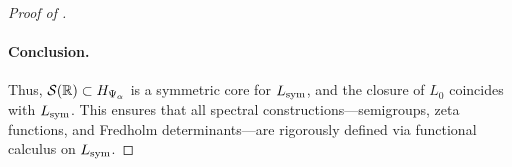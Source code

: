 \begin{proof}[Proof of ]
\paragraph{Conclusion.}
Thus, \( \mathcal{S}(\mathbb{R}) \subset H_{\Psi_\alpha} \) is a symmetric core for \( L_{\mathrm{sym}} \), and the closure of \( L_0 \) coincides with \( L_{\mathrm{sym}} \). This ensures that all spectral constructions—semigroups, zeta functions, and Fredholm determinants—are rigorously defined via functional calculus on \( L_{\mathrm{sym}} \).
\end{proof}

